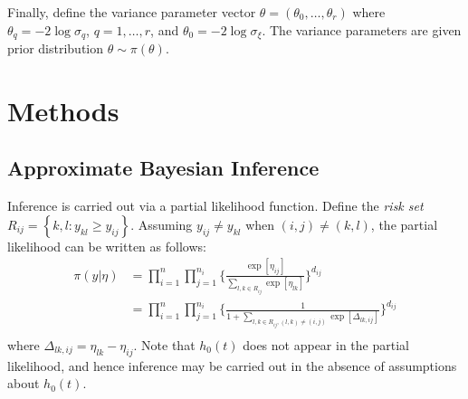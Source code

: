 \documentclass[ba]{imsart}
\begin{document}
Finally, define the variance parameter vector $\theta = (\theta_{0},\ldots,\theta_{r})$ where $\theta_{q} = -2\log\sigma_{q}$, $q = 1,\ldots,r$, and $\theta_{0} = -2\log\sigma_{\xi}$. The variance parameters are given prior distribution $\theta \sim \pi(\theta)$.

\section{Methods}\label{sec:method}


\subsection{Approximate Bayesian Inference}

Inference is carried out via a partial likelihood function. Define the \textit{risk set} $R_{ij} = \left\{k,l : y_{kl} \geq y_{ij}\right\}$. Assuming $y_{ij} \neq y_{kl}$ when $(i,j) \neq (k,l)$, the partial likelihood can be written as follows: 
\begin{equation}\begin{aligned}\label{eqn:partial}
\pi(y|\eta) &= \prod_{i=1}^{n}\prod_{j=1}^{n_{i}} \bigg\{\frac{\exp[\eta_{ij}]}{{\sum_{l,k\in R_{ij}}^{}\exp[\eta_{lk}]}}\bigg \}^{d_{ij}} \\
&= \prod_{i=1}^{n}\prod_{j=1}^{n_{i}} \bigg\{\frac{1}{{1 + \sum_{l,k\in R_{ij} , (l,k) \neq (i,j)}\exp[\Delta_{lk,ij}]}}\bigg \}^{d_{ij}} \\
\end{aligned}\end{equation}
where $\Delta_{lk,ij} = \eta_{lk} - \eta_{ij}$. Note that $h_{0}(t)$ does not appear in the partial likelihood, and hence inference may be carried out in the absence of assumptions about $h_{0}(t)$. 
\end{document}
